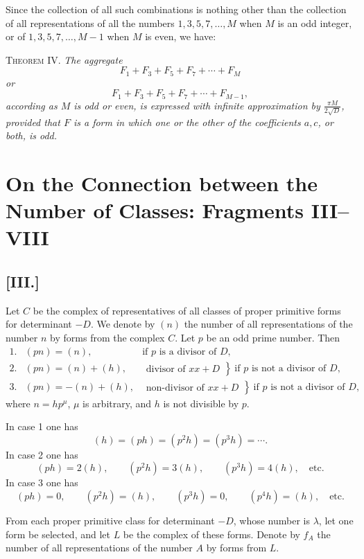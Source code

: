 \documentclass[12pt]{article}
\begin{document}
Since the collection of all such combinations is nothing other than the collection of all representations of all the numbers $1,3,5,7,\ldots,M$ when $M$ is an odd integer, or of $1,3,5,7,\ldots,M-1$ when $M$ is even, we have:

\textsc{Theorem IV.} \emph{The aggregate}
\[
F_1+F_3+F_5+F_7+\cdots+F_M
\]
\emph{or}
\[
F_1+F_3+F_5+F_7+\cdots+F_{M-1},
\]
\emph{according as $M$ is odd or even, is expressed with infinite approximation by $\frac{\pi M}{2\sqrt D}$, provided that $F$ is a form in which one or the other of the coefficients $a,c$, or both, is odd.}




\section*{On the Connection between the Number of Classes: Fragments III--VIII}

\subsection*{[III.]}

Let $C$ be the complex of representatives of all classes of proper primitive forms for determinant $-D$. We denote by $(n)$ the number of all representations of the number $n$ by forms from the complex $C$. Let $p$ be an odd prime number. Then
\[
\begin{array}{rll}
1.&(pn)=(n),&\text{if }p\text{ is a divisor of }D,\\[2mm]
2.&(pn)=(n)+(h),&
\left.
\begin{array}{l}
\text{divisor of }xx+D
\end{array}
\right\}\ \text{if }p\text{ is not a divisor of }D,\\[3mm]
3.&(pn)=-(n)+(h),&
\left.
\begin{array}{l}
\text{non-divisor of }xx+D
\end{array}
\right\}\ \text{if }p\text{ is not a divisor of }D,
\end{array}
\]
where $n=hp^\mu$, $\mu$ is arbitrary, and $h$ is not divisible by $p$.

In case 1 one has
\[
(h)=(ph)=(p^2h)=(p^3h)=\cdots .
\]
In case 2 one has
\[
(ph)=2(h),\qquad (p^2h)=3(h),\qquad (p^3h)=4(h),\quad\text{etc.}
\]
In case 3 one has
\[
(ph)=0,\qquad (p^2h)=(h),\qquad (p^3h)=0,\qquad (p^4h)=(h),\quad\text{etc.}
\]

From each proper primitive class for determinant $-D$, whose number is $\lambda$, let one form be selected, and let $L$ be the complex of these forms. Denote by $f_A$ the number of all representations of the number $A$ by forms from $L$.
\end{document}
